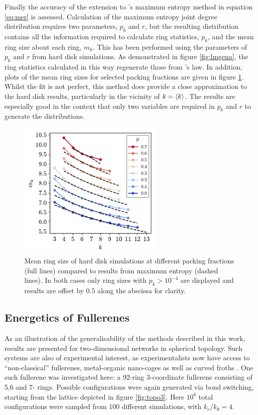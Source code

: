 Finally the accuracy of the extension to \lm's maximum entropy method in equation \eqref{eq:mer} is assessed.
Calculation of the maximum entropy joint degree distribution requires two parameters, $p_6$ and $r$, but the resulting distribution contains all the information required to calculate ring statistics, $p_k$, and the mean ring size about each ring, $m_k$.
This has been performed using the parameters of $p_6$ and $r$ from hard disk simulations.
As demonstrated in figure \ref{fig:lmgena}, the ring statistics calculated in this way regenerate those from \lm's law.
In addition, plots of the mean ring sizes for selected packing fractions are given in figure \ref{fig:hdme}. Whilst the fit is not perfect, this method does provide a close approximation to the hard disk results, particularly in the vicinity of $k=\langle k \rangle$. The results are especially good in the context that only two variables are required in $p_6$ and $r$ to generate the distributions.

\begin{figure}
\centering
        \includegraphics[width=7cm]{./figures/general_networks/hdme.pdf}
        \caption{Mean ring size of hard disk simulations at different packing fractions (full lines) compared to results from maximum entropy (dashed lines). In both cases only ring sizes with $p_k>10^{-4}$ are displayed and results are offset by $0.5$ along the abscissa for clarity.}
        \label{fig:hdme}
\end{figure}

\subsection{Energetics of Fullerenes}

As an illustration of the generalisability of the methods described in this work, results are presented for two\--dimensional networks in spherical topology.
Such systems are also of experimental interest, as experimentalists now have access to ``non-classical'' fullerenes\cite{Tian2019,Guan2019,Brotsman2017,Kemnitz2018}, metal-organic nano-cages\cite{Fujita2016,Wang2017} as well as curved froths \cite{Roth2012}.
One such fullerene was investigated here: a 92\--ring 3\--coordinate fullerene consisting of 5,6 and 7\-- rings.
Possible configurations were again generated via bond switching, starting from the lattice depicted in figure \ref{fig:topo3}.
Here $10^6$ total configurations were sampled from 100 different simulations, with $k_r/k_\theta=4$.

